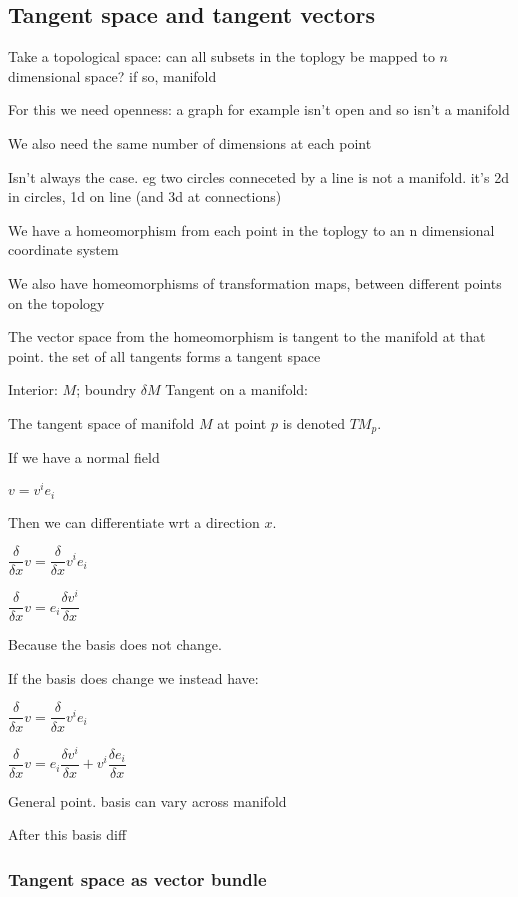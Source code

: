 
\subsection{Tangent space and tangent vectors}

Take a topological space: can all subsets in the toplogy be mapped to \(n\) dimensional space? if so, manifold

For this we need openness: a graph for example isn't open and so isn't a manifold

We also need the same number of dimensions at each point

Isn't always the case. eg two circles conneceted by a line is not a manifold. it's 2d in circles, 1d on line (and 3d at connections)

We have a homeomorphism from each point in the toplogy to an n dimensional coordinate system

We also have homeomorphisms of transformation maps, between different points on the topology

The vector space from the homeomorphism is tangent to the manifold at that point. the set of all tangents forms a tangent space

Interior: \(M\); boundry \(\delta M\)
Tangent on a manifold:

The tangent space of manifold \(M\) at point \(p\) is denoted \(TM_p\).

If we have a normal field

\(v=v^ie_i\)

Then we can differentiate wrt a direction \(x\).

\(\dfrac{\delta }{\delta x}v=\dfrac{\delta }{\delta x}v^ie_i\)

\(\dfrac{\delta }{\delta x}v=e_i\dfrac{\delta v^i}{\delta x}\)

Because the basis does not change.

If the basis does change we instead have:

\(\dfrac{\delta }{\delta x}v=\dfrac{\delta }{\delta x}v^ie_i\)

\(\dfrac{\delta }{\delta x}v=e_i\dfrac{\delta v^i}{\delta x}+v^i\dfrac{\delta e_i }{\delta x}\)

General point. basis can vary across manifold

After this basis diff

\subsubsection{Tangent space as vector bundle}

